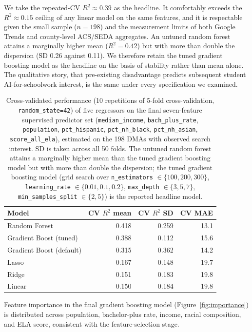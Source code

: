 \documentclass[11pt]{article}
\begin{document}
We take the repeated-CV $R^2 \approx 0.39$ as the headline. It comfortably exceeds the $R^2 \approx 0.15$ ceiling of any linear model on the same features, and it is respectable given the small sample ($n=198$) and the measurement limits of both Google Trends and county-level ACS/SEDA aggregates. An untuned random forest attains a marginally higher mean ($R^2 = 0.42$) but with more than double the dispersion (SD 0.26 against 0.11). We therefore retain the tuned gradient boosting model as the headline on the basis of stability rather than mean alone. The qualitative story, that pre-existing disadvantage predicts subsequent student AI-for-schoolwork interest, is the same under every specification we examined.

\begin{table}[!htbp]
\centering
\small
\begin{tabular}{lrrr}
\toprule
Model & CV $R^2$ mean & CV $R^2$ SD & CV MAE \\
\midrule
Random Forest             & 0.418 & 0.259 & 13.1 \\
Gradient Boost (tuned)    & 0.388 & 0.112 & 15.6 \\
Gradient Boost (default)  & 0.315 & 0.362 & 14.2 \\
Lasso                     & 0.167 & 0.148 & 19.7 \\
Ridge                     & 0.151 & 0.183 & 19.8 \\
Linear                    & 0.150 & 0.184 & 19.8 \\
\bottomrule
\end{tabular}
\caption{Cross-validated performance (10 repetitions of 5-fold cross-validation, \texttt{random\_state=42}) of five regressors on the final seven-feature supervised predictor set (\texttt{median\_income}, \texttt{bach\_plus\_rate}, \texttt{population}, \texttt{pct\_hispanic}, \texttt{pct\_nh\_black}, \texttt{pct\_nh\_asian}, \texttt{score\_all\_ela}), estimated on the 198 DMAs with observed search interest. SD is taken across all 50 folds. The untuned random forest attains a marginally higher mean than the tuned gradient boosting model but with more than double the dispersion; the tuned gradient boosting model (grid search over \texttt{n\_estimators} $\in\{100,200,300\}$, \texttt{learning\_rate} $\in\{0.01,0.1,0.2\}$, \texttt{max\_depth} $\in\{3,5,7\}$, \texttt{min\_samples\_split} $\in\{2,5\}$) is the reported headline model.}
\label{tab:models}
\end{table}

Feature importance in the final gradient boosting model (Figure~\ref{fig:importance}) is distributed across population, bachelor-plus rate, income, racial composition, and ELA score, consistent with the feature-selection stage.
\end{document}
